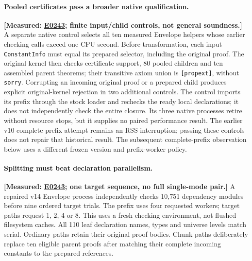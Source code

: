 \documentclass[10pt,twocolumn]{article}
\newcommand{\measured}[1]{\textbf{[Measured: #1]}}
\newcommand{\expref}[2]{\href{https://github.com/yunwei37/proofserve/blob/main/docs/tmp/build-and-evaluate/step-#1/step-report.md}{E#2}}
\begin{document}
\paragraph{Pooled certificates pass a broader native qualification.}
\measured{\expref{0243-20261101T091434+0000}{0243}; finite input/child controls, not general soundness.}
A separate native control selects all ten measured Envelope helpers whose
earlier checking calls exceed one CPU second.
Before transformation, each input \texttt{ConstantInfo} must equal its
prepared selector, including the original proof.
The original kernel then checks certificate support, 80 pooled children and
ten assembled parent theorems; their transitive axiom union is
\texttt{[propext]}, without \texttt{sorry}.
Corrupting an incoming original proof or a prepared child produces explicit
original-kernel rejection in two additional controls.
The control imports its prefix through the stock loader and rechecks the
ready local declarations; it does not independently check the entire closure.
Its three native processes retire without resource stops, but it supplies
no paired performance result.
The earlier v10 complete-prefix attempt remains an RSS interruption;
passing these controls does not repair that historical result.
The subsequent complete-prefix observation below uses a different frozen
version and prefix-worker policy.

\paragraph{Splitting must beat declaration parallelism.}
\measured{\expref{0243-20261101T091434+0000}{0243}; one target sequence, no full single-mode pair.}
A repaired v14 Envelope process independently checks 10,751 dependency
modules before nine ordered target trials.
The prefix uses four requested workers; target paths request 1, 2, 4 or 8.
This uses a fresh checking environment, not flushed filesystem caches.
All 110 leaf declaration names, types and universe levels match serial.
Ordinary paths retain their original proof bodies.
Chunk paths deliberately replace ten eligible parent proofs after matching
their complete incoming constants to the prepared references.
\end{document}
